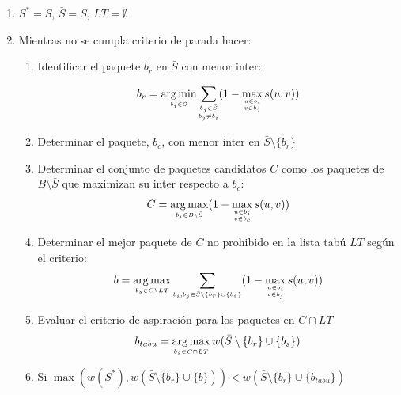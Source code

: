 \begin{enumerate}
\item $S^* = S$, $ \bar{S}= S$, $LT = \emptyset$

\item Mientras no se cumpla criterio de parada hacer:

\begin{enumerate}
\item Identificar el paquete $b_r$ en $\bar{S}$ con menor inter:

\begin{align*}
b_r = \operatorname*{arg\,min}_{\scriptscriptstyle b_i \in \bar{S}} \sum_{\substack{\scriptscriptstyle  b_j \in \bar{S} \\ \scriptscriptstyle  b_j \ne b_i}} (1-\max_{\substack{\scriptscriptstyle  u\in b_i \\ \scriptscriptstyle v \in b_j}} s(u,v))
\end{align*}

\item Determinar el paquete, $b_c$, con menor inter en $\bar{S} \setminus \{b_r\}$

\item Determinar el conjunto de paquetes candidatos $C$ como los paquetes de $B\setminus \bar{S}$ que maximizan su inter respecto a $b_c$:
\begin{align*}
C = \operatorname*{arg\,max}_{\scriptscriptstyle b_i \in B \setminus \bar{S}} (1-\max_{\substack{\scriptscriptstyle u\in b_i \\ \scriptscriptstyle v \in b_c}} s(u,v))
\end{align*}

\item Determinar el mejor paquete de $C$ no prohibido en la lista tabú $LT$ según el criterio:
\begin{align*}
b = \operatorname*{arg\,max}_{\scriptscriptstyle b_s \in C \setminus LT} \sum_{\scriptscriptstyle b_i, b_j \in \bar{S}\setminus \{b_r\} \cup \{b_s\}}(1-\max_{\substack{\scriptscriptstyle u\in b_i \\ \scriptscriptstyle v \in b_j}} s(u,v))
\end{align*}

\item Evaluar el criterio de aspiración para los paquetes en $C \cap LT$
\begin{align*}
b_{tabu} = \operatorname*{arg\,max}_{\scriptscriptstyle b_s \in C \cap LT} w(\bar{S} \setminus \{b_r\} \cup \{b_s\})
\end{align*}

\item Si $\max(w(S^*),w(\bar{S} \setminus \{b_r\} \cup \{b\})) < w(\bar{S} \setminus \{b_r\} \cup \{b_{tabu}\})$



\end{enumerate}
\end{enumerate}
